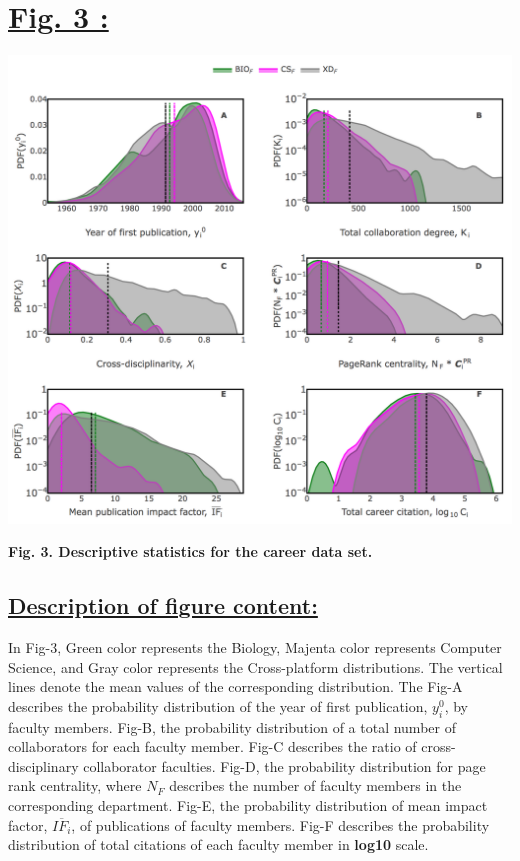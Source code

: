 \documentclass{article}\usepackage[]{graphicx}\usepackage[]{color}
\begin{document}
\newpage
\section*{\underline{Fig. 3 :}}
\begin{center}
\includegraphics[scale=0.6]{3.png}
\newline
\par{\textbf{Fig. 3. Descriptive statistics for the career data set.}}
\end{center}
\subsection*{\underline{Description of figure content:}}
\par{In Fig-3, Green color represents the Biology, Majenta color represents Computer Science, and Gray color represents the Cross-platform distributions. The vertical lines denote the mean values of the corresponding distribution. The Fig-A describes the probability distribution of the year of first publication, $y_i^0$, by faculty members. Fig-B, the probability distribution of a total number of collaborators for each faculty member. Fig-C describes the ratio of cross-disciplinary collaborator faculties. Fig-D, the probability distribution for page rank centrality, where $N_F$ describes the number of faculty members in the corresponding department. Fig-E, the probability distribution of mean impact factor, $\overline{IF_i}$, of publications of faculty members. Fig-F describes the probability distribution of total citations of each faculty member in \textbf{log10} scale.}
\end{document}

